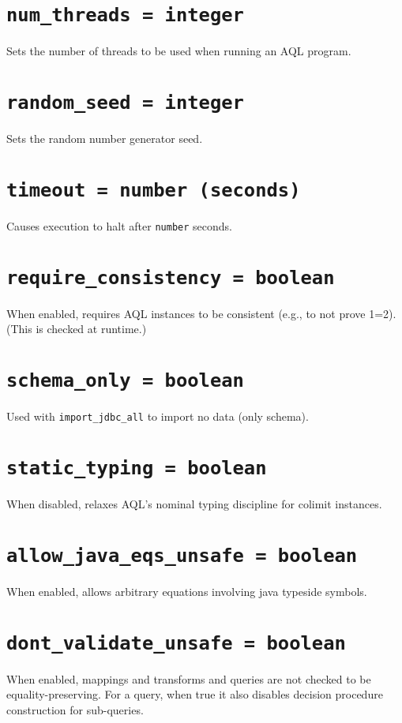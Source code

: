 \documentclass[10pt]{book}
\begin{document}
\section{{\tt num\_threads = integer}}
Sets the number of threads to be used when running an AQL program.

\section{{\tt random\_seed = integer}}
Sets the random number generator seed.

\section{{\tt timeout = number (seconds)}}
Causes execution to halt after {\tt number} seconds.

\section{{\tt require\_consistency = boolean}}
When enabled, requires AQL instances to be consistent (e.g., to not prove 1=2).  (This is checked at runtime.)

\section{{\tt schema\_only = boolean}}

Used with {\tt import\_jdbc\_all} to import no data (only schema).

\section{{\tt static\_typing = boolean}}
When disabled, relaxes AQL's nominal typing discipline for colimit instances.

\section{{\tt allow\_java\_eqs\_unsafe = boolean}}
When enabled, allows arbitrary equations involving java typeside symbols.

\section{{\tt dont\_validate\_unsafe = boolean}}
When enabled, mappings and transforms and queries are not checked to be equality-preserving.  For a query, when true it also disables decision procedure construction for sub-queries.
\end{document}
